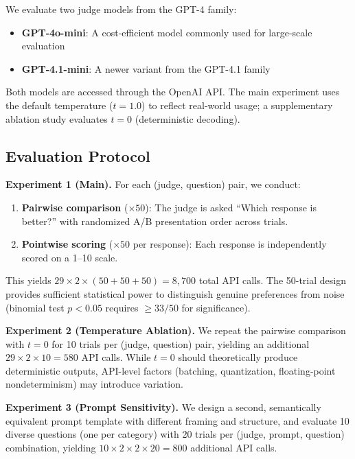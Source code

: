 \documentclass{ijclclp}
\begin{document}
We evaluate two judge models from the GPT-4 family:
\begin{itemize}[nosep]
    \item \textbf{GPT-4o-mini}: A cost-efficient model commonly used for large-scale evaluation
    \item \textbf{GPT-4.1-mini}: A newer variant from the GPT-4.1 family
\end{itemize}

Both models are accessed through the OpenAI API. The main experiment uses the default temperature ($t=1.0$) to reflect real-world usage; a supplementary ablation study evaluates $t=0$ (deterministic decoding).

\subsection{Evaluation Protocol}

\textbf{Experiment 1 (Main).} For each (judge, question) pair, we conduct:

\begin{enumerate}[nosep]
    \item \textbf{Pairwise comparison} ($\times 50$): The judge is asked ``Which response is better?'' with randomized A/B presentation order across trials.
    \item \textbf{Pointwise scoring} ($\times 50$ per response): Each response is independently scored on a 1--10 scale.
\end{enumerate}

This yields $29 \times 2 \times (50 + 50 + 50) = 8{,}700$ total API calls. The 50-trial design provides sufficient statistical power to distinguish genuine preferences from noise (binomial test $p < 0.05$ requires $\geq 33/50$ for significance).

\textbf{Experiment 2 (Temperature Ablation).} We repeat the pairwise comparison with $t=0$ for 10 trials per (judge, question) pair, yielding an additional $29 \times 2 \times 10 = 580$ API calls. While $t=0$ should theoretically produce deterministic outputs, API-level factors (batching, quantization, floating-point nondeterminism) may introduce variation.

\textbf{Experiment 3 (Prompt Sensitivity).} We design a second, semantically equivalent prompt template with different framing and structure, and evaluate 10 diverse questions (one per category) with 20 trials per (judge, prompt, question) combination, yielding $10 \times 2 \times 2 \times 20 = 800$ additional API calls.
\end{document}
